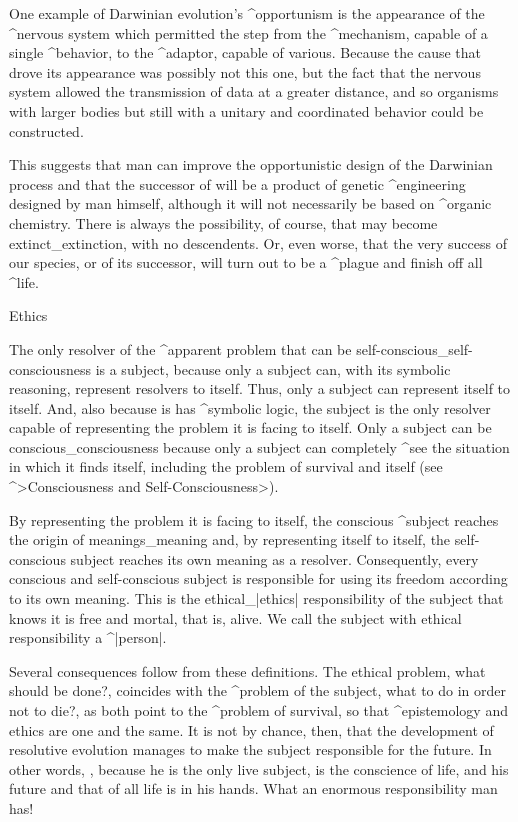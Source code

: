 One example of Darwinian evolution's ^{opportunism} is the appearance of
the ^{nervous system} which permitted the step from the ^{mechanism},
capable of a single  ^{behavior}, to the ^{adaptor}, capable of various.
Because the cause that drove its appearance was possibly not this one,
but the fact that the nervous system allowed the transmission of data at
a greater distance, and so organisms with larger bodies but still with a
unitary and coordinated behavior could be constructed.

This suggests that man can improve the opportunistic design of the
Darwinian process and that the successor of  will be
a product of genetic ^{engineering} designed by man himself, although it
will not necessarily be based on ^{organic chemistry}. There is always
the possibility, of course, that  may become
extinct_{extinction}, with no descendents. Or, even worse, that the very
success of our species, or of its successor, will turn out to be a
^{plague} and finish off all ^{life}.


\Section Ethics

The only resolver of the ^{apparent problem} that can be
self-conscious_{self-consciousness} is a subject, because only a subject
can, with its symbolic reasoning, represent resolvers to itself. Thus,
only a subject can represent itself to itself. And, also because is has
^{symbolic logic}, the subject is the only resolver capable of
representing the problem it is facing to itself. Only a subject can be
conscious_{consciousness} because only a subject can completely ^{see}
the situation in which it finds itself, including the problem of
survival and itself (see ^>Consciousness and Self-Consciousness>).

By representing the problem it is facing to itself, the conscious
^{subject} reaches the origin of meanings_{meaning} and, by representing
itself to itself, the self-conscious subject reaches its own meaning as
a resolver. Consequently, every conscious and self-conscious subject is
responsible for using its freedom according to its own meaning. This is
the ethical_|ethics| responsibility of the subject that knows it is free
and mortal, that is, alive. We call the subject with ethical
responsibility a ^|person|.

Several consequences follow from these definitions. The ethical problem,
what should be done?, coincides with the ^{problem of the subject}, what
to do in order not to die?, as both point to the ^{problem of survival},
so that ^{epistemology} and ethics are one and the same. It is not by
chance, then, that the development of resolutive evolution manages to
make the subject responsible for the future. In other words,
, because he is the only live subject, is the
conscience of life, and his future and that of all life is in his hands.
What an enormous responsibility man has!


